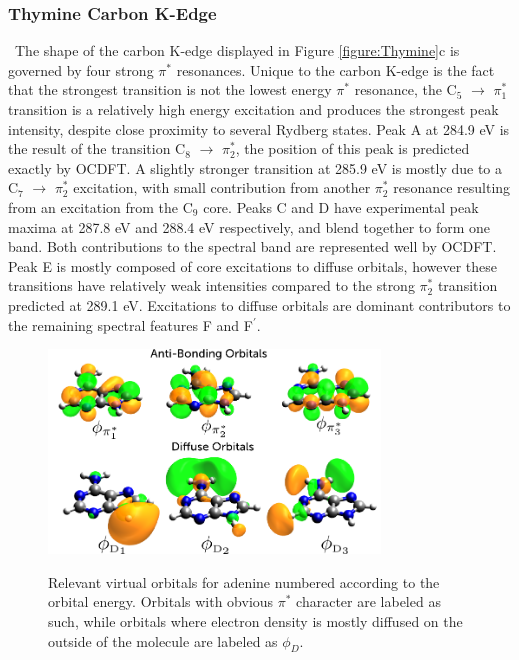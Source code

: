 \documentclass[12pt]{article}
\begin{document}
\subsubsection{Thymine Carbon K-Edge} \
   The shape of the carbon K-edge displayed in Figure \ref{figure:Thymine}c is governed by four strong $\pi^*$ resonances. Unique to the carbon K-edge is the fact that the strongest transition is not the lowest energy $\pi^*$ resonance, the C$_5$ $\rightarrow$ $\pi_1^*$ transition is a relatively high energy excitation and produces the strongest peak intensity, despite close proximity to several Rydberg states. Peak A at 284.9 eV is the result of the transition C$_8$ $\rightarrow$ $\pi_2^*$, the position of this peak is predicted exactly by OCDFT. A slightly stronger transition at 285.9 eV is mostly due to a  C$_7$ $\rightarrow$ $\pi_2^*$ excitation, with small contribution from another $\pi_2^*$ resonance resulting from an excitation from the C$_9$ core. Peaks C and D have experimental peak maxima at 287.8 eV and 288.4 eV respectively, and blend together to form one band. Both contributions to the spectral band are represented well by OCDFT.
Peak E is mostly composed of core excitations to diffuse orbitals, however these transitions have relatively weak intensities compared to the strong $\pi_2^*$ transition predicted at 289.1 eV. Excitations to diffuse orbitals are dominant contributors to the remaining spectral features F and F$^{\prime}$.
\begin{figure}[!h]
\centering
\includegraphics[width=8.8cm]{AdenineVirtuals.png} \\
\caption{Relevant virtual orbitals for adenine numbered according to the orbital energy. Orbitals with obvious $\pi^*$ character are labeled as such, while orbitals where electron density is mostly diffused on the outside of the molecule are labeled as $\phi_D$.}
\label{figure:adeninevirtuals} 
\end{figure}
\end{document}
